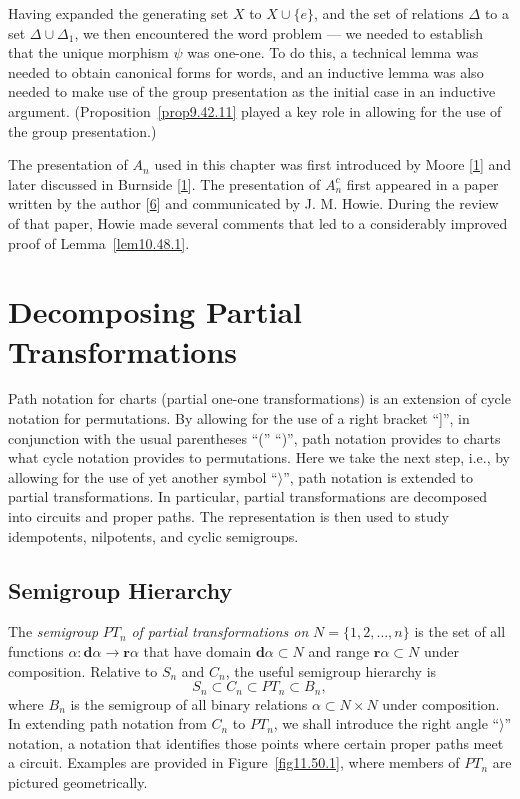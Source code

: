 \documentclass{surv-l}
\numberwithin{equation}{section}
\numberwithin{table}{section}
\numberwithin{figure}{section}
\theoremstyle{definition}
\begin{document}
Having expanded the generating set $X$ to $X\cup\{e\}$, and the
set of relations $\Delta$ to a set
$\Delta\cup\Delta_{1}$, we then encountered the word problem
--- we needed to establish that the unique morphism $\psi$ was
one-one. To do this, a technical lemma was needed to obtain
canonical forms for words, and an inductive lemma was also needed
to make use of the group presentation as the initial case in an
inductive argument. (Proposition~\ref{prop9.42.11} played a key
role in allowing for the use of the group presentation.)

The presentation of $A_{n}$ used in this chapter was first
introduced by Moore [\hyperlink{bib53}{1}] and later
discussed in Burnside [\hyperlink{bib6}{1}]. The
presentation of $A_{n}^{c}$ first appeared in a paper written by
the author [\hyperlink{bib71e}{6}] and communicated by J.
M. Howie. During the review of that paper,
Howie made several comments that led to a considerably improved
proof of Lemma~\ref{lem10.48.1}.

\chapter{Decomposing Partial Transformations}\label{chap11}

Path notation for charts (partial one-one transformations) is an
extension of cycle notation for permutations. By allowing for the
use of a right bracket ``]'', in conjunction with the usual
parentheses ``('' ``)'', path notation provides to charts what
cycle notation provides to permutations. Here we take the next
step, i.e., by allowing for the use of yet another symbol
``$\rangle$'', path notation is extended to partial
transformations. In particular, partial transformations are
decomposed into circuits and proper paths. The representation is
then used to study idempotents, nilpotents, and cyclic semigroups.

\setcounter{section}{49}

\section{Semigroup Hierarchy}\label{sec11.50}

The \emph{semigroup} $PT_{n}$ \emph{of partial transformations on}
$N=\{1,2,\ldots, n\}$ is the set of all functions $\alpha :
\mathbf{d}\alpha\rightarrow \mathbf{r}\alpha$ that have domain
$\mathbf{d}\alpha\subset N$ and range $\mathbf{r}\alpha\subset N$
under composition. Relative to $S_{n}$ and $C_{n}$, the useful
semigroup hierarchy is
\[
S_{n}\subset C_{n}\subset PT_{n}\subset B_{n},
\]
where $B_{n}$ is the semigroup of all binary relations
$\alpha\subset N\times N$ under composition. In extending path
notation from $C_{n}$ to $PT_{n}$, we shall introduce the right
angle ``$\rangle$'' notation, a notation that identifies those
points where certain proper paths meet a circuit. Examples are
provided in Figure~\ref{fig11.50.1}, where members of $PT_{n}$ are
pictured geometrically.
\end{document}
